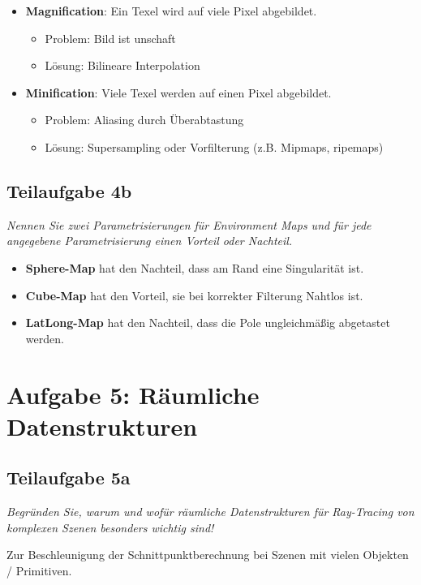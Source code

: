 \documentclass[a4paper]{scrartcl}
\begin{document}
\begin{itemize}
    \item \textbf{Magnification}: Ein Texel wird auf viele Pixel abgebildet.
    \begin{itemize}
        \item Problem: Bild ist unschaft
        \item Lösung: Bilineare Interpolation
    \end{itemize}
    \item \textbf{Minification}: Viele Texel werden auf einen Pixel abgebildet.
    \begin{itemize}
        \item Problem: Aliasing durch Überabtastung
        \item Lösung: Supersampling oder Vorfilterung (z.B. Mipmaps, ripemaps)
    \end{itemize}
\end{itemize}

\subsection*{Teilaufgabe 4b}
\textit{Nennen Sie zwei Parametrisierungen für Environment Maps und für jede angegebene
Parametrisierung einen Vorteil oder Nachteil.}\\
\begin{itemize}
    \item \textbf{Sphere-Map} hat den Nachteil, dass am Rand eine Singularität
          ist.
    \item \textbf{Cube-Map} hat den Vorteil, sie bei korrekter Filterung
          Nahtlos ist.
    \item \textbf{LatLong-Map} hat den Nachteil, dass die Pole ungleichmäßig
          abgetastet werden.
\end{itemize}

\section*{Aufgabe 5: Räumliche Datenstrukturen}
\subsection*{Teilaufgabe 5a}
\textit{Begründen Sie, warum und wofür räumliche Datenstrukturen für
Ray-Tracing von komplexen Szenen besonders wichtig sind!}

Zur Beschleunigung der Schnittpunktberechnung bei Szenen mit vielen Objekten /
Primitiven.
\end{document}
